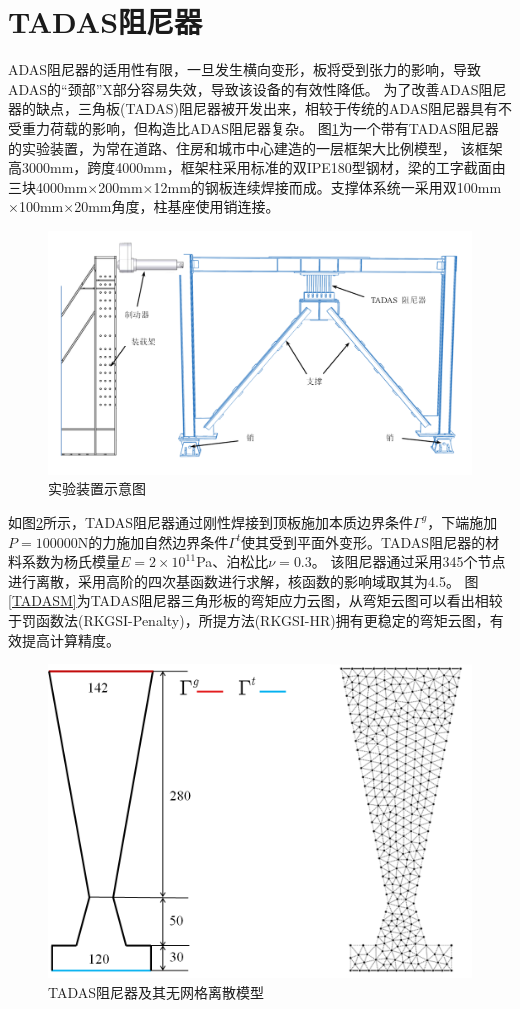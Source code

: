 \section{TADAS阻尼器}
ADAS阻尼器的适用性有限，一旦发生横向变形，板将受到张力的影响，导致ADAS的“颈部”X部分容易失效，导致该设备的有效性降低。
为了改善ADAS阻尼器的缺点，三角板(TADAS)阻尼器被开发出来，相较于传统的ADAS阻尼器具有不受重力荷载的影响，但构造比ADAS阻尼器复杂。
图\ref{TADAS1}为一个带有TADAS阻尼器的实验装置\cite{mohammadi2017}，为常在道路、住房和城市中心建造的一层框架大比例模型，
该框架高3000mm，跨度4000mm，框架柱采用标准的双IPE180型钢材，梁的工字截面由三块4000mm$\times$200mm$\times$12mm的钢板连续焊接而成。支撑体系统一采用双100mm$\times$100mm$\times$20mm角度，柱基座使用销连接。
\newpage
\begin{figure}[H]
    \centering
    \includegraphics[scale=0.4]{figure/DAMPER/TADAS/1.png}
    \caption{实验装置示意图\cite{mohammadi2017}}\label{TADAS1}
\end{figure}
如图\ref{TADASmsh}所示，TADAS阻尼器通过刚性焊接到顶板施加本质边界条件$\Gamma^g$，下端施加$P=100000$N的力施加自然边界条件$\Gamma^t$使其受到平面外变形。TADAS阻尼器的材料系数为杨氏模量$E=2\times 10^{11}$Pa、泊松比$\nu=0.3$。
该阻尼器通过采用345个节点进行离散，采用高阶的四次基函数进行求解，核函数的影响域取其为4.5。
图\ref{TADASM}为TADAS阻尼器三角形板的弯矩应力云图，从弯矩云图可以看出相较于罚函数法(RKGSI-Penalty)，所提方法(RKGSI-HR)拥有更稳定的弯矩云图，有效提高计算精度。
\begin{figure}[H]
    \centering
    \includegraphics[scale=0.5]{figure/DAMPER/TADAS/TADAS dampers_msh.png}
    \caption{TADAS阻尼器及其无网格离散模型}\label{TADASmsh}
\end{figure}
